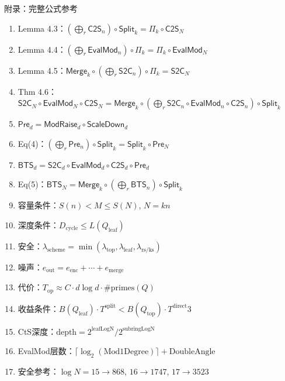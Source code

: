 \documentclass[aspectratio=169, 10pt, xcolor=svgnames, table, UTF8]{ctexbeamer}
\newcommand{\bts}{\mathsf{BTS}}
\newcommand{\cots}{\mathsf{C2S}}
\newcommand{\stoc}{\mathsf{S2C}}
\newcommand{\evalmod}{\mathsf{EvalMod}}
\newcommand{\splitop}{\mathsf{Split}}
\newcommand{\mergeop}{\mathsf{Merge}}
\newcommand{\preop}{\mathsf{Pre}}
\newcommand{\sdop}{\mathsf{ScaleDown}}
\newcommand{\mrop}{\mathsf{ModRaise}}
\begin{document}
\begin{frame}[allowframebreaks]{附录：完整公式参考}
\begin{enumerate}
    \item Lemma 4.3：\((\bigoplus_r \cots_n) \circ \splitop_k = \Pi_k \circ \cots_N\)
    \item Lemma 4.4：\((\bigoplus_r \evalmod_n) \circ \Pi_k = \Pi_k \circ \evalmod_N\)
    \item Lemma 4.5：\(\mergeop_k \circ (\bigoplus_r \stoc_n) \circ \Pi_k = \stoc_N\)
    \item Thm 4.6：\(\stoc_N\circ\evalmod_N\circ\cots_N = \mergeop_k \circ (\bigoplus_r \stoc_n\circ\evalmod_n\circ\cots_n) \circ \splitop_k\)
    \item \(\preop_d = \mrop_d \circ \sdop_d\)
    \item Eq(4)：\((\bigoplus_r \preop_n) \circ \splitop_k = \splitop_k \circ \preop_N\)
    \item \(\bts_d = \stoc_d \circ \evalmod_d \circ \cots_d \circ \preop_d\)
    \item Eq(5)：\(\bts_N = \mergeop_k \circ (\bigoplus_r \bts_n) \circ \splitop_k\)
    \item 容量条件：\(S(n) < M \le S(N)\), \(N = kn\)
    \item 深度条件：\(D_{\mathrm{cycle}} \le L(Q_{\mathrm{leaf}})\)
    \item 安全：\(\lambda_{\mathrm{scheme}} = \min(\lambda_{\mathrm{top}}, \lambda_{\mathrm{leaf}}, \lambda_{\mathrm{rs/ks}})\)
    \item 噪声：\(e_{\mathrm{out}} = e_{\mathrm{enc}} + \cdots + e_{\mathrm{merge}}\)
    \item 代价：\(T_{\mathrm{op}} \approx C \cdot d\log d \cdot \#\mathrm{primes}(Q)\)
    \item 收益条件：\(B(Q_{\mathrm{leaf}})\cdot T^{\mathrm{split}} < B(Q_{\mathrm{top}})\cdot T^{\mathrm{direct}}\)3
    \item CtS深度：\(\text{depth} = 2^{\mathrm{leafLogN}} / 2^{\mathrm{subringLogN}}\)
    \item EvalMod层数：\(\lceil\log_2(\mathrm{Mod1Degree})\rceil + \mathrm{DoubleAngle}\)
    \item 安全参考：\(\log N=15\to868\), \(16\to1747\), \(17\to3523\)
  \end{enumerate}
\end{frame}
\end{document}
